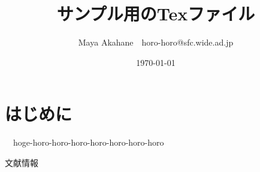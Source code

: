 \documentclass[twocolumn, a4j]{article}
\title{サンプル用のTexファイル}
\author{Maya Akahane\footnotemark[2]　horo-horo@sfc.wide.ad.jp}
\date{\today}
\renewcommand{\thefootnote}{\fnsymbol{footnote}}
\renewcommand{\thefootnote}{\arabic{footnote}}
\begin{document}

\renewcommand{\thefootnote}{\fnsymbol{footnote}}
\renewcommand{\thefootnote}{\arabic{footnote}}

\section{はじめに}

  　hoge-horo-horo-horo-horo-horo-horo-horo

\renewcommand{\refname}{参考文献}
\begin{thebibliography}{数字}
   文献情報
\end{thebibliography}
\end{document}
